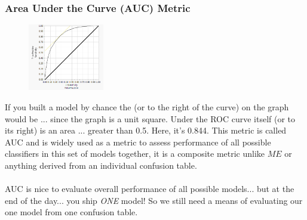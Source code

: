 \documentclass[handout]{beamer}
\begin{document}
\begin{frame}\frametitle{Area Under the Curve (AUC) Metric}

\vspace{-0.2cm}
\begin{figure}
\centering
\hspace{-0.5cm}\includegraphics[width=1.3in]{roc_curve.png}
\end{figure}

\small
\vspace{-0.3cm}
If you built a model by chance the  (or to the right of the curve) on the graph would be ...  since the graph is a unit square. Under the ROC curve itself (or to its right) is an area ... \pause greater than 0.5. Here, it's 0.844. \pause This metric is called AUC and is widely used as a metric to assess performance of all possible classifiers in this set of models together, it is a composite metric unlike $ME$ or anything derived from an individual confusion table.\\~\\

AUC is nice to evaluate overall performance of all possible models... but at the end of the day... \pause you ship \emph{ONE} model! So we still need a means of evaluating our one model from one confusion table.

\end{frame}
\end{document}
